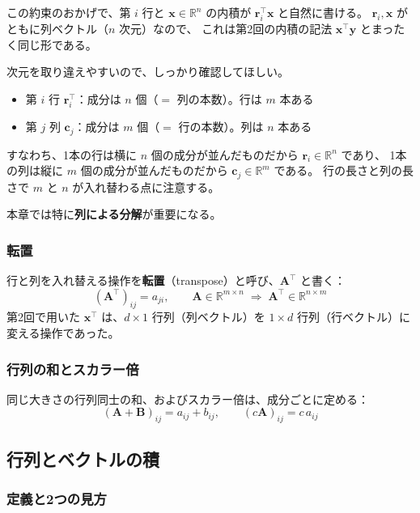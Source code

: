 この約束のおかげで、第 $i$ 行と $\bm{x} \in \mathbb{R}^n$ の内積が
$\bm{r}_i^\top \bm{x}$ と自然に書ける。
$\bm{r}_i, \bm{x}$ がともに列ベクトル（$n$ 次元）なので、
これは第2回の内積の記法 $\bm{x}^\top\bm{y}$ とまったく同じ形である。


次元を取り違えやすいので、しっかり確認してほしい。
\begin{itemize}
  \item 第 $i$ 行 $\bm{r}_i^\top$：成分は $n$ 個（$=$ 列の本数）。行は $m$ 本ある
  \item 第 $j$ 列 $\bm{c}_j$：成分は $m$ 個（$=$ 行の本数）。列は $n$ 本ある
\end{itemize}
すなわち、1本の行は横に $n$ 個の成分が並んだものだから $\bm{r}_i \in \mathbb{R}^n$ であり、
1本の列は縦に $m$ 個の成分が並んだものだから $\bm{c}_j \in \mathbb{R}^m$ である。
行の長さと列の長さで $m$ と $n$ が入れ替わる点に注意する。

本章では特に\textbf{列による分解}が重要になる。

\subsubsection{転置}

行と列を入れ替える操作を\textbf{転置}（transpose）と呼び、$\bm{A}^\top$ と書く：
\begin{equation}
  (\bm{A}^\top)_{ij} = a_{ji}, \qquad \bm{A} \in \mathbb{R}^{m \times n} \;\Rightarrow\; \bm{A}^\top \in \mathbb{R}^{n \times m}
\end{equation}
第2回で用いた $\bm{x}^\top$ は、$d \times 1$ 行列（列ベクトル）を
$1 \times d$ 行列（行ベクトル）に変える操作であった。

\subsubsection{行列の和とスカラー倍}

同じ大きさの行列同士の和、およびスカラー倍は、成分ごとに定める：
\begin{equation}
  (\bm{A} + \bm{B})_{ij} = a_{ij} + b_{ij}, \qquad (c\bm{A})_{ij} = c\, a_{ij}
\end{equation}


\subsection{行列とベクトルの積}

\subsubsection{定義と2つの見方}

